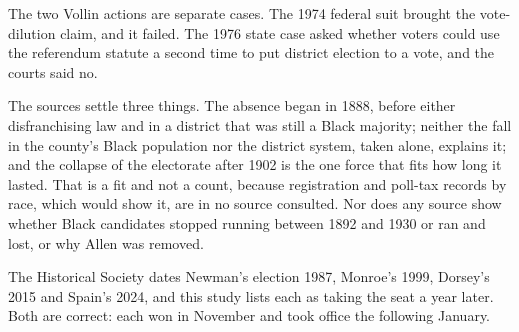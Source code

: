 
The two Vollin actions are separate cases. The 1974 federal suit brought the
vote-dilution claim, and it failed. The 1976 state case asked whether voters
could use the referendum statute a second time to put district election to a
vote, and the courts said no.

The sources settle three things. The absence began in 1888, before either
disfranchising law and in a district that was still a Black majority; neither
the fall in the county's Black population nor the district system, taken alone,
explains it; and the collapse of the electorate after 1902 is the one force
that fits how long it lasted. That is a fit and not a count, because
registration and poll-tax records by race, which would show it, are in no source
consulted. Nor does any source show whether Black candidates stopped running
between 1892 and 1930 or ran and lost, or why Allen was removed.

The Historical Society dates Newman's election 1987, Monroe's 1999, Dorsey's
2015 and Spain's 2024, and this study lists each as taking the seat a year later. Both
are correct: each won in November and took office the following January.

